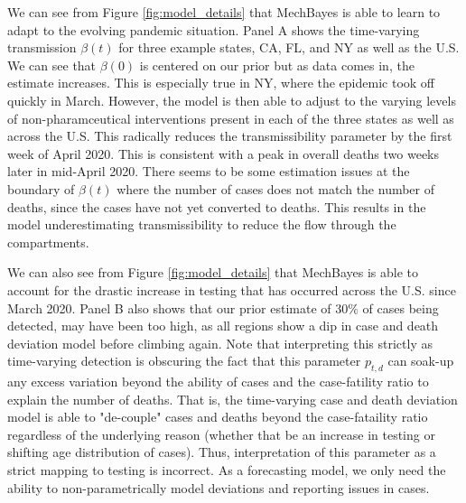 \documentclass[11pt]{amsart}
\begin{document}
We can see from Figure \ref{fig:model_details} that MechBayes is able to learn to adapt to the evolving pandemic situation. Panel A shows the time-varying transmission $\beta(t)$ for three example states, CA, FL, and NY as well as the U.S. We can see that $\beta(0)$ is centered on our prior but as data comes in, the estimate increases. This is especially true in NY, where the epidemic took off quickly in March. However, the model is then able to adjust to the varying levels of non-pharamceutical interventions present in each of the three states as well as across the U.S. This radically reduces the transmissibility parameter by the first week of April 2020. This is consistent with a peak in overall deaths two weeks later in mid-April 2020. There seems to be some estimation issues at the boundary of $\beta(t)$ where the number of cases does not match the number of deaths, since the cases have not yet converted to deaths. This results in the model underestimating transmissibility to reduce the flow through the compartments. 

We can also see from Figure \ref{fig:model_details}  that MechBayes is able to account for the drastic increase in testing that has occurred across the U.S. since March 2020. Panel B also shows that our prior estimate of 30\% of cases being detected, may have been too high, as all regions show a dip in case and death deviation model before climbing again. Note that interpreting this strictly as time-varying detection is obscuring the fact that this parameter $p_{t,d}$ can soak-up any excess variation beyond the ability of cases and the case-fatility ratio to explain the number of deaths. That is, the time-varying case and death deviation model is able to "de-couple" cases and deaths beyond the case-fataility ratio regardless of the underlying reason (whether that be an increase in testing or shifting age distribution of cases). Thus, interpretation of this parameter as a strict mapping to testing is incorrect. As a forecasting model, we only need the ability to non-parametrically model deviations and reporting issues in cases.
\end{document}
